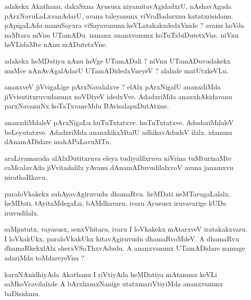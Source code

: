 \documentclass{article}
\begin{document}
\begin{mn}
adakekx  Akathanu,  dakaSxna  Ayususx  niyamitavAgidadxrU,  nAshavAgada  pArxNavuLaLxvanAdarU,  avana  taleyanunx  viVraBadarxnu  
katatxrisidanu.  pApigaLAda  manuSayxra  viSayavanunx  heVLatakakxdedxVnide ?  avanu  hoVda  naMtara  niVnu  UTamADu.  nananx  
ananxvanunx  koTuTxbiDutetxVne.  niVnu  heVLidaMte  nAnu  mADutetxVne.
\end{mn}

\begin{mn}
adakekx  heMDatiyu  nAnu  heVge  UTamADali ?  niVnu  UTamADuvudakekx  muMce  nAnAvAgalAdarU  UTamADidedxVneyeV ?  alalxde  matUtxkeVLu.
\end{mn}

\begin{mn}
ananxveV  jiVvigaLige  pArxNavalalxve ?  elAlx  pArxNigalU  ananxdiMda  jiVvisutitxruvudanunx  noVDiyeV  idedxVve.  AdadxriMda  
ananxhAkidavanu  parxNavanuNx koTaTxvaneMdu  BAvisalapxDutAtxne.
\end{mn}

\begin{mn}
ananxdiMdaleV  pArxNigaLu  huTuTxtatxve.  huTuTxtatxve.  AdudariMdaleV  beLeyutatxve.  AdadxriMda  ananxkikxMtalU  adhikavAdudeV  
ilalx.  idanunx  dAnamADidare  mahAPaLavuMTu.
\end{mn}

\begin{mn}
araLiyamarada  alAlxDutitxruva  eleya  tudiyalilxruva  niVrina  tuMturinaMte  caMcalavAda  jiVvitadalilx  yAvanu  
dAnamADuvudilalxvoV  avana  janamxvu  nirathaRkavu.
\end{mn}

\begin{mn}
paraloVkakekx  sahAyavAgiruvudu  dhamaRvu.  heMDati  neMTarugaLalalx.  heMDati,  tAyitaMdegaLu,  bAMdhavaru,  ivaru  Ayususx  
iruvavarige  kUDa  iruvudilalx.
\end{mn}

\begin{mn}
saMpatutx,  vayasusx,  senxVhitaru,  ivaru  I  loVkakekx  mAtarxveV  iratakakxvaru.  I  loVkakUkx,  paraloVkakUkx  hitavAgiruvudu  
dhamaRvoMdeV.  A  dhamaRvu  dhamaRkekxlAlx  sherxVSaThxvAdudu.  A  ananxvanunx  UTamADidare  namage  adariMda  toMdareyeVnu ?
\end{mn}

\begin{mn}
karuNAnidhiyAda  Akathanu  I riVtiyAda  heMDatiya  mAtanunx  keVLi  saMkoVcavilalxde  A  bArxhamxNanige  utatxmariVtiyiMda  ananxvanunx  baDisidanu.
\end{mn}
\end{document}
